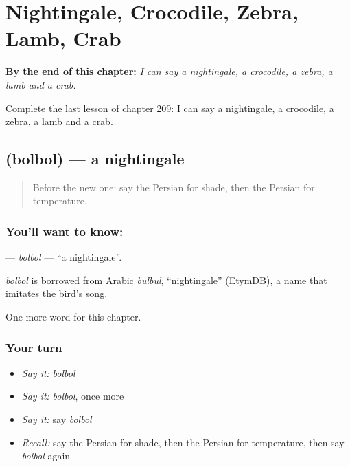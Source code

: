 
\chapter{Nightingale, Crocodile, Zebra, Lamb, Crab}
\label{ch:fa-nightingale-crocodile-zebra-lamb-crab}

\begin{chapteropening}
\textbf{By the end of this chapter:} \emph{I can say a nightingale, a crocodile, a zebra, a lamb and a crab.}

Complete the last lesson of chapter 209: I can say a nightingale, a crocodile, a zebra, a lamb and a crab.
\end{chapteropening}

\section[\texorpdfstring{\fa{بلبل} (bolbol)}{بلبل (bolbol)}]{ (bolbol) — a nightingale}

\label{lesson:FA-C209-bolbol}



\begin{quote}
Before the new one: say the Persian for shade, then the Persian for temperature.
\end{quote}

\subsection*{You'll want to know: }
\textbf{} — \emph{bolbol} — \textquotedblleft{}a nightingale\textquotedblright{}.

\begin{cousinweb}
\emph{bolbol} is borrowed from Arabic \emph{bulbul}, \textquotedblleft{}nightingale\textquotedblright{} (EtymDB), a name that imitates the bird's song.
\end{cousinweb}

\begin{grammarlens}[title={What you've built}]
One more word for this chapter.
\end{grammarlens}

\subsection*{Your turn}
\begin{itemize}
\raggedright
  \item \emph{Say it:} \emph{bolbol}
  \item \emph{Say it:} \emph{bolbol}, once more
  \item \emph{Say it:} say \emph{bolbol}
  \item \emph{Recall:} say the Persian for shade, then the Persian for temperature, then say \emph{bolbol} again
\end{itemize}

